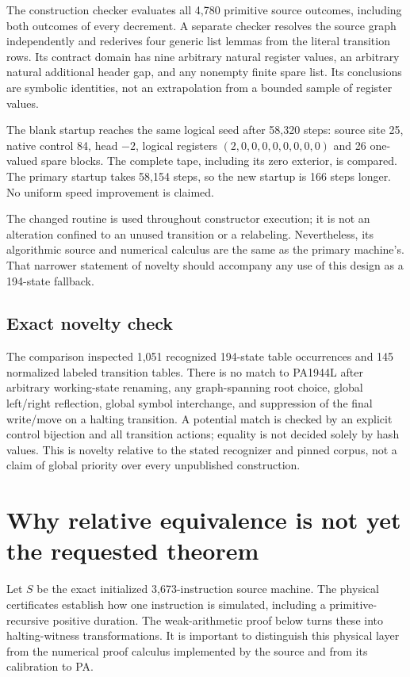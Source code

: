 \documentclass[10pt,letterpaper]{article}
\begin{document}
The construction checker evaluates all 4,780 primitive source outcomes,
including both outcomes of every decrement. A separate checker resolves
the source graph independently and rederives four generic list lemmas
from the literal transition rows. Its contract domain has nine arbitrary
natural register values, an arbitrary natural additional header gap,
and any nonempty finite spare list. Its conclusions are symbolic
identities, not an extrapolation from a bounded sample of register
values.



The blank startup reaches the same logical seed after 58,320 steps:
source site 25, native control 84, head $-2$, logical registers
$(2,0,0,0,0,0,0,0,0)$ and 26 one-valued spare blocks. The complete
tape, including its zero exterior, is compared. The primary startup
takes 58,154 steps, so the new startup is 166 steps longer. No uniform
speed improvement is claimed.

The changed routine is used throughout constructor execution; it is
not an alteration confined to an unused transition or a relabeling.
Nevertheless, its algorithmic source and numerical calculus are the
same as the primary machine's. That narrower statement of novelty
should accompany any use of this design as a 194-state fallback.

\subsection{Exact novelty check}

The comparison inspected 1,051 recognized 194-state table occurrences
and 145 normalized labeled transition tables. There is no match to
PA1944L after arbitrary working-state renaming, any graph-spanning
root choice, global left/right reflection, global symbol interchange,
and suppression of the final write/move on a halting transition. A
potential match is checked by an explicit control bijection and all
transition actions; equality is not decided solely by hash values.
This is novelty relative to the stated recognizer and pinned corpus,
not a claim of global priority over every unpublished construction.

\section{Why relative equivalence is not yet the requested theorem}
\label{sec:arithmetic-status}

Let $S$ be the exact initialized 3,673-instruction source machine.
The physical certificates establish how one instruction is simulated,
including a primitive-recursive positive duration. The weak-arithmetic
proof below turns these into halting-witness transformations. It is
important to distinguish this physical layer from the numerical proof
calculus implemented by the source and from its calibration to PA.
\end{document}
